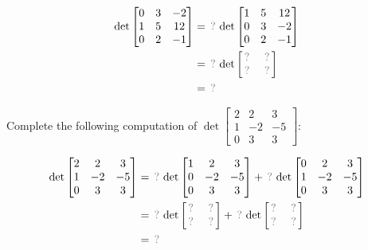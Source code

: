 \begin{applicationActivities}{2}{26}
\begin{activity}{5}
  \begin{align*}
    \det \begin{bmatrix} 0 & 3 & -2 \\ 1 & 5 & 12 \\ 0 & 2 & -1 \end{bmatrix}
  &=
    \unknown
    \det \begin{bmatrix} 1 & 5 & 12 \\ 0 & 3 & -2 \\ 0 & 2 & -1 \end{bmatrix}
  \\ &=
    \unknown
    \det \begin{bmatrix} \unknown & \unknown \\ \unknown & \unknown \end{bmatrix}
  \\ &=
    \unknown
  \end{align*}
\end{activity}

\begin{activity}{10}
  Complete the following computation of
  $\det \begin{bmatrix} 2 & 2 & 3 \\ 1 & -2 & -5 \\ 0 & 3 & 3 \end{bmatrix}$:

  \begin{align*}
    \det \begin{bmatrix} 2 & 2 & 3 \\ 1 & -2 & -5 \\ 0 & 3 & 3 \end{bmatrix}
  &=
    \unknown\det \begin{bmatrix} 1 & 2 & 3 \\ 0 & -2 & -5 \\ 0 & 3 & 3 \end{bmatrix}+
    \unknown\det \begin{bmatrix} 0 & 2 & 3 \\ 1 & -2 & -5 \\ 0 & 3 & 3 \end{bmatrix}
  \\ &=
    \unknown
    \det \begin{bmatrix} \unknown & \unknown \\ \unknown & \unknown \end{bmatrix}+
    \unknown
    \det \begin{bmatrix} \unknown & \unknown \\ \unknown & \unknown \end{bmatrix}
  \\ &=
    \unknown
  \end{align*}
\end{activity}


\end{applicationActivities}
